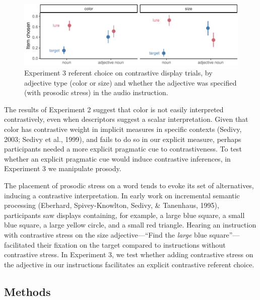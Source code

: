 \documentclass[10pt, letterpaper]{article}
\newenvironment{CodeChunk}{}{}
\begin{document}
\begin{CodeChunk}
\begin{figure}[tb]

{\centering \includegraphics{figs/e3_fig-1} 

}

\caption[Experiment 3 referent choice on contrastive display trials, by adjective type (color or size) and whether the adjective was specified (with prosodic stress) in the audio instruction]{Experiment 3 referent choice on contrastive display trials, by adjective type (color or size) and whether the adjective was specified (with prosodic stress) in the audio instruction.}\label{fig:e3_fig}
\end{figure}
\end{CodeChunk}

The results of Experiment 2 suggest that color is not easily interpreted
contrastively, even when descriptors suggest a scalar interpretation.
Given that color has contrastive weight in implicit measures in specific
contexts (Sedivy, 2003; Sedivy et al., 1999), and fails to do so in our
explicit measure, perhaps participants needed a more explicit pragmatic
cue to contrastiveness. To test whether an explicit pragmatic cue would
induce contrastive inferences, in Experiment 3 we manipulate prosody.

The placement of prosodic stress on a word tends to evoke its set of
alternatives, inducing a contrastive interpretation. In early work on
incremental semantic processing (Eberhard, Spivey-Knowlton, Sedivy, \&
Tanenhaus, 1995), participants saw displays containing, for example, a
large blue square, a small blue square, a large yellow circle, and a
small red triangle. Hearing an instruction with contrastive stress on
the size adjective---``Find the \emph{large} blue square''---facilitated
their fixation on the target compared to instructions without
contrastive stress. In Experiment 3, we test whether adding contrastive
stress on the adjective in our instructions facilitates an explicit
contrastive referent choice.

\subsection{Methods}\label{methods-1}
\end{document}
